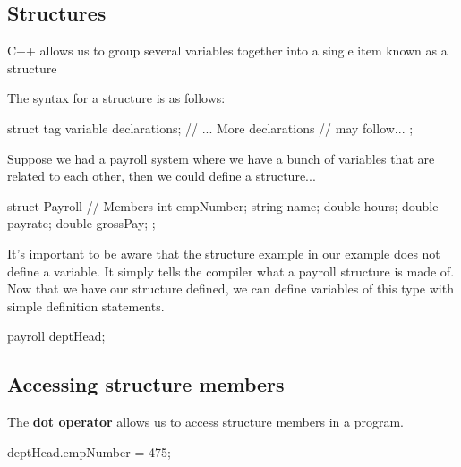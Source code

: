 \documentclass{report}
\begin{document}
	\bigbreak \noindent 
	\subsection{Structures}
	\bigbreak \noindent 
	\begin{concept}
	    C++ allows us to group several variables together into a single item known as a structure
	\end{concept}
	\bigbreak \noindent 
	The syntax for a structure is as follows:
	\bigbreak \noindent 
	
	\begin{cppcode}
struct tag {
    variable declarations;
    // ... More declarations 
    //     may follow...
};
	\end{cppcode}
	
	\bigbreak \noindent 
	Suppose we had a payroll system where we have a bunch of variables that are related to each other, then we could define a structure...
	\bigbreak \noindent 
	
	\begin{cppcode}
struct Payroll {
    // Members
    int empNumber;
    string name;
    double hours;
    double payrate;
    double grossPay;
};
	\end{cppcode}
	
	\bigbreak \noindent 

    \bigbreak \noindent 
	It's important to be aware that the structure example in our example does not define a variable. It simply tells the compiler what a payroll structure is made of.
	\bigbreak \noindent 
	Now that we have our structure defined, we can define variables of this type with simple definition statements.
	\bigbreak \noindent 
	
	\begin{cppcode}
payroll deptHead;
	\end{cppcode}
	

	\bigbreak \noindent 
	\subsection{Accessing structure members}
	\bigbreak \noindent 
	\begin{concept}
	    The \textbf{dot operator} allows us to access structure members in a program.
	\end{concept}
	\bigbreak \noindent 
	
	\begin{cppcode}
deptHead.empNumber = 475;
	\end{cppcode}
	
\end{document}

